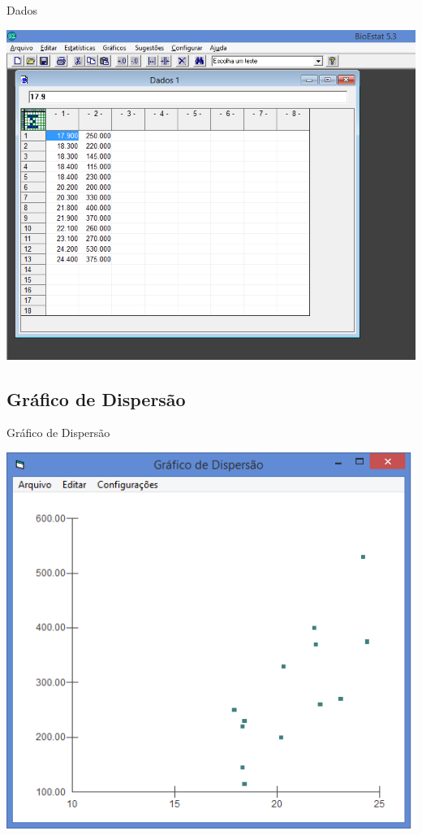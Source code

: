 \documentclass{beamer}
\begin{document}
\begin{frame}{Dados}
  \begin{center}
    \includegraphics[height=0.9\textheight]{dados}
  \end{center}
\end{frame}


\subsection{Gráfico de Dispersão}

\begin{frame}{Gráfico de Dispersão}
  \begin{center}
    \includegraphics[height=0.9\textheight]{grafico_dispersao}
  \end{center}
\end{frame}
\end{document}
